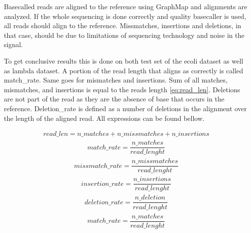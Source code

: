 \documentclass[times, utf8, diplomski, numeric, english]{fer}
\begin{document}
Basecalled reads are aligned to the reference using GraphMap and alignments are analyzed. If the whole sequencing is done correctly and quality basecaller is used, all reads should align to the reference. Missmatches, insertions and deletions, in that case, should be due to limitations of sequencing technology and noise in the signal.

To get conclusive results this is done on both test set of the ecoli dataset as well as lambda dataset. 
A portion of the read length that aligns as correctly is called match\_rate. Same goes for mismatches and insertions. 
Sum of all matches, mismatches, and insertions is equal to the reads length \ref{eq:read_len}. Deletions are not part of the read as they are the absence of base that occurs in the reference. Deletion\_rate is defined as a number of deletions in the alignment over the length of the aligned read. All expressions can be found bellow.

\begin{equation}
\begin{gathered}
\label{eq:read_len}
read\_len =  n\_matches + n\_missmatches + n\_insertions 
\end{gathered}
\end{equation}
\begin{equation}
\begin{gathered}
match\_rate = \dfrac{n\_matches}{read\_lenght}
\end{gathered}
\end{equation}
\begin{equation}
\begin{gathered}
missmatch\_rate = \dfrac{n\_missmatches}{read\_lenght}
\end{gathered}
\end{equation}
\begin{equation}
\begin{gathered}
insertion\_rate = \dfrac{n\_insertions}{read\_lenght}
\end{gathered}
\end{equation}
\begin{equation}
\begin{gathered}
deletion\_rate = \dfrac{n\_deletion}{read\_lenght}
\end{gathered}
\end{equation}
\begin{equation}
\begin{gathered}
match\_rate = \dfrac{n\_matches}{read\_lenght}
\end{gathered}
\end{equation}
\end{document}
